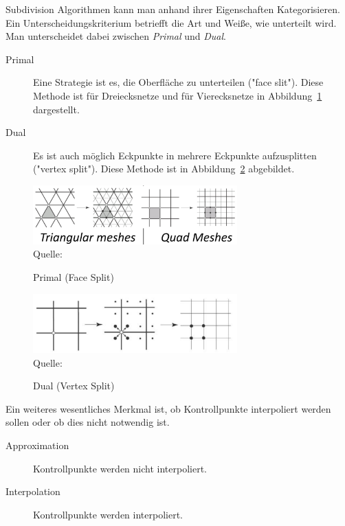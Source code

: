 Subdivision Algorithmen kann man anhand ihrer Eigenschaften Kategorisieren.
Ein Unterscheidungskriterium betriefft die Art und Weiße, wie unterteilt wird.
Man unterscheidet dabei zwischen \emph{Primal} und \emph{Dual}.
\begin{description}
 \item[Primal] Eine Strategie ist es, die Oberfläche zu unterteilen ("face slit").
 Diese Methode ist für Dreiecksnetze und für Vierecksnetze in Abbildung~\ref{fig:sd_primal} dargestellt.
 \item[Dual] Es ist auch möglich Eckpunkte in mehrere Eckpunkte aufzusplitten ("vertex split").
 Diese Methode ist in Abbildung~\ref{fig:sd_dual} abgebildet.
\end{description}
\begin{figure}[h]
  \caption{Primal (Face Split)}
  \centering
  \includegraphics[width=0.7\textwidth]{content/media/sd_primal}
  \\Quelle: \cite{Standford.24.07.2015}
  \label{fig:sd_primal}
\end{figure}
\begin{figure}[h]
  \caption{Dual (Vertex Split)}
  \centering
  \includegraphics[width=0.7\textwidth]{content/media/sd_dual}
  \\Quelle: \cite{Standford.24.07.2015}
  \label{fig:sd_dual}
\end{figure}

Ein weiteres wesentliches Merkmal ist, ob Kontrollpunkte interpoliert werden sollen oder ob dies nicht notwendig ist. 
\begin{description}
 \item[Approximation] Kontrollpunkte werden nicht interpoliert.
 \item[Interpolation] Kontrollpunkte werden interpoliert.
\end{description}

